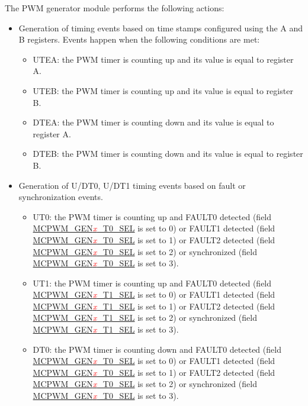 \documentclass[main\_\_EN.tex]{subfiles}
\begin{document}
The PWM generator module performs the following actions: 
\begin{itemize}
    \item Generation of timing events based on time stamps configured using the A and B registers. Events happen when the following conditions are met: 
    \begin{itemize}
        \item UTEA: the PWM timer is counting up and its value is equal to register A.
        \item UTEB: the PWM timer is counting up and its value is equal to register B.
        \item DTEA: the PWM timer is counting down and its value is equal to register A.
        \item DTEB: the PWM timer is counting down and its value is equal to register B.
    \end{itemize}
    \item Generation of U/DT0, U/DT1 timing events based on fault or synchronization events.
    \begin{itemize}
        \item UT0: the PWM timer is counting up and FAULT0 detected (field \hyperref[fielddesc:MCPWMGEN0T0SEL]{MCPWM\_GEN\textcolor{red}{\it{x}}\_T0\_SEL} is set to 0) or FAULT1 detected (field \hyperref[fielddesc:MCPWMGEN0T0SEL]{MCPWM\_GEN\textcolor{red}{\it{x}}\_T0\_SEL} is set to 1) or FAULT2 detected (field \hyperref[fielddesc:MCPWMGEN0T0SEL]{MCPWM\_GEN\textcolor{red}{\it{x}}\_T0\_SEL} is set to 2) or synchronized (field \hyperref[fielddesc:MCPWMGEN0T0SEL]{MCPWM\_GEN\textcolor{red}{\it{x}}\_T0\_SEL} is set to 3).
        \item UT1: the PWM timer is counting up and FAULT0 detected (field \hyperref[fielddesc:MCPWMGEN0T0SEL]{MCPWM\_GEN\textcolor{red}{\it{x}}\_T1\_SEL} is set to 0) or FAULT1 detected (field \hyperref[fielddesc:MCPWMGEN0T0SEL]{MCPWM\_GEN\textcolor{red}{\it{x}}\_T1\_SEL} is set to 1) or FAULT2 detected (field \hyperref[fielddesc:MCPWMGEN0T0SEL]{MCPWM\_GEN\textcolor{red}{\it{x}}\_T1\_SEL} is set to 2) or synchronized (field \hyperref[fielddesc:MCPWMGEN0T0SEL]{MCPWM\_GEN\textcolor{red}{\it{x}}\_T1\_SEL} is set to 3).
        \item DT0: the PWM timer is counting down and FAULT0 detected (field \hyperref[fielddesc:MCPWMGEN0T0SEL]{MCPWM\_GEN\textcolor{red}{\it{x}}\_T0\_SEL} is set to 0) or FAULT1 detected (field \hyperref[fielddesc:MCPWMGEN0T0SEL]{MCPWM\_GEN\textcolor{red}{\it{x}}\_T0\_SEL} is set to 1) or FAULT2 detected (field \hyperref[fielddesc:MCPWMGEN0T0SEL]{MCPWM\_GEN\textcolor{red}{\it{x}}\_T0\_SEL} is set to 2) or synchronized (field \hyperref[fielddesc:MCPWMGEN0T0SEL]{MCPWM\_GEN\textcolor{red}{\it{x}}\_T0\_SEL} is set to 3).

\end{itemize}
\end{itemize}
\end{document}
